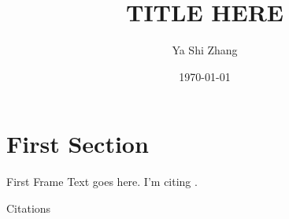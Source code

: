 \documentclass{beamer}
\title{TITLE HERE}
\author{Ya Shi Zhang}
\institute{INSTITUTE HERE}
\date{\today}
\begin{document}
\maketitle


\section{First Section}
\begin{frame}{First Frame}
Text goes here. I'm citing \citet{einstein}.
\end{frame}

\begin{frame}{Citations}
\end{frame}
\end{document}
